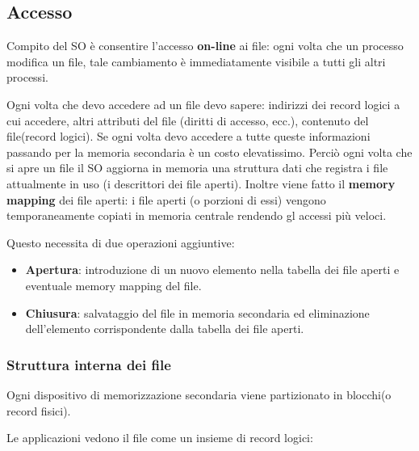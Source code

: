 \documentclass{article}
\begin{document}
 \subsection{Accesso}
 \noindent Compito del SO è consentire l'accesso \textbf{on-line} ai file: ogni
 volta che un processo modifica un file, tale cambiamento
 è immediatamente visibile a tutti gli altri processi.

\noindent Ogni volta che devo accedere ad un file devo sapere:
 indirizzi dei record logici a cui accedere, altri attributi del file 
(diritti di accesso, ecc.), contenuto del file(record logici).
Se ogni volta devo accedere a tutte queste informazioni passando per
la memoria secondaria è un costo elevatissimo. 
Perciò ogni volta che si apre un file il SO aggiorna in memoria una struttura
dati che registra i file attualmente in uso (i descrittori dei file aperti).
Inoltre viene fatto il \textbf{memory mapping} dei file aperti:
i file aperti (o porzioni di essi) vengono temporaneamente copiati
in memoria centrale rendendo gl accessi più veloci.

\noindent Questo necessita di due operazioni aggiuntive:
\begin{itemize}
    \item \textbf{Apertura}: introduzione di un nuovo elemento
    nella tabella dei file aperti e eventuale memory mapping 
    del file.
    \item \textbf{Chiusura}: salvataggio del file in memoria secondaria ed
    eliminazione dell'elemento corrispondente dalla tabella dei
    file aperti.
\end{itemize}

\subsubsection{Struttura interna dei file}
Ogni dispositivo di memorizzazione secondaria viene partizionato
in blocchi(o record fisici).
\medskip

\noindent {} 
\medskip

\noindent Le applicazioni vedono il file come un insieme di record logici:
\medskip

\noindent {} 
\medskip
\end{document}
